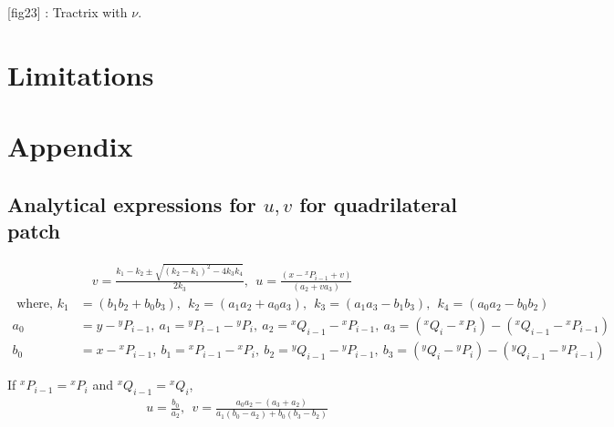 \documentclass[12pt,a4]{article}
\begin{document}
[fig23] : Tractrix with $\nu$.

\section{Limitations}

\section{Appendix}	
\subsection{Analytical expressions for $u,v$ for quadrilateral patch}\label{app:Analylit_u_v_quad}
\begin{align}
&\quad {v} = \frac{k_1-k_2\pm \sqrt{\left(k_2-k_1\right)^2-4k_3k_4}}{2k_3},~~{u} = \frac{\left(x-{}^xP_{i-1}+{v}\right)}{\left( a_2+{v} a_3 \right)}\\
\nonumber\text{ where, }k_1 &= \left(b_1b_2+b_0b_3 \right),~~k_2 = \left(a_1a_2+a_0a_3 \right),~~
k_3 = \left(a_1a_3-b_1b_3 \right),~~k_4=\left(a_0a_2-b_0b_2 \right)\\
\nonumber a_0 &= y-{}^yP_{i-1},~a_1 = {}^yP_{i-1}-{}^yP_i,~a_2 = {}^xQ_{i-1}-{}^xP_{i-1},~a_3 = \left({}^xQ_{i}-{}^xP_i\right)-\left({}^xQ_{i-1}-{}^xP_{i-1}\right)\\
\nonumber b_0 &= x-{}^xP_{i-1},~b_1 = {}^xP_{i-1}-{}^xP_i,~b_2 = {}^yQ_{i-1}-{}^yP_{i-1},~b_3 = \left({}^yQ_{i}-{}^yP_i\right)-\left({}^yQ_{i-1}-{}^yP_{i-1}\right)
\end{align}

If ${}^xP_{i-1}={}^xP_{i}$ and ${}^xQ_{i-1}={}^xQ_{i}$, 
\begin{align}
{u} = \frac{b_0}{a_2},~~{v} = \frac{a_0a_2-\left(a_3+a_2 \right)}{a_1\left(b_0-a_2\right)+b_0\left(b_3-b_2 \right)}
\end{align}
\end{document}
